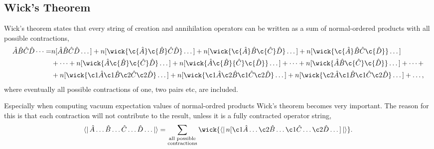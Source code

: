 	\subsection{Wick's Theorem}
		Wick's theorem states that every string of creation and annihilation operators can
		be written as a sum of normal-ordered products with all possible contractions,
		\begin{equation}
			\begin{aligned}
			\hat{A}\hat{B}\hat{C}\hat{D}\dots
			=&n[\hat{A}\hat{B}\hat{C}\hat{D}\dots]
			+ n[\wick{\c{\hat{A}}\c{\hat{B}}\hat{C}\hat{D}}\dots]
			+ n[\wick{\c{\hat{A}}\hat{B}\c{\hat{C}}\hat{D}}\dots]
			+ n[\wick{\c{\hat{A}}\hat{B}\hat{C}\c{\hat{D}}}\dots] \\
			&+ \dots
			+ n[\wick{{\hat{A}}\c{\hat{B}}\c{\hat{C}}\hat{D}}\dots]
			+ n[\wick{{\hat{A}}\c{\hat{B}}{\hat{C}}\c{\hat{D}}}\dots]
			+ \dots 
			+ n[\wick{{\hat{A}}{\hat{B}}\c{\hat{C}}\c{\hat{D}}}\dots]
			+ \dots + \\
			&+ n[\wick{\c1{\hat{A}}\c1{\hat{B}}\c2{\hat{C}}\c2{\hat{D}}}\dots]
			+ n[\wick{\c1{\hat{A}}\c2{\hat{B}}\c1{\hat{C}}\c2{\hat{D}}}\dots]
			+ n[\wick{\c2{\hat{A}}\c1{\hat{B}}\c1{\hat{C}}\c2{\hat{D}}}\dots]
			+ \dots,
		\end{aligned}
		\end{equation}
		where eventually all possible contractions of one, two pairs etc, are included.

		Especially when computing vacuum expectation values of normal-ordred products 
        Wick's theorem becomes very important. The reason for this is that each contraction
        will not contribute to the result, unless it is a fully contracted operator string,
		\begin{equation} 
			\bra{}\hat{A} \dots \hat{B} \dots \hat{C} \dots \hat{D} \dots \ket{}
				= \sum_{\substack{\text{all possible} \\ \text{contractions}}}
				\wick{
				\bra{} n[\c1{\hat{A}} \dots \c2{\hat{B}} \dots 
				\c1{\hat{C}} \dots \c2{\hat{D}} \dots] \ket{}
				}.
		\end{equation}

